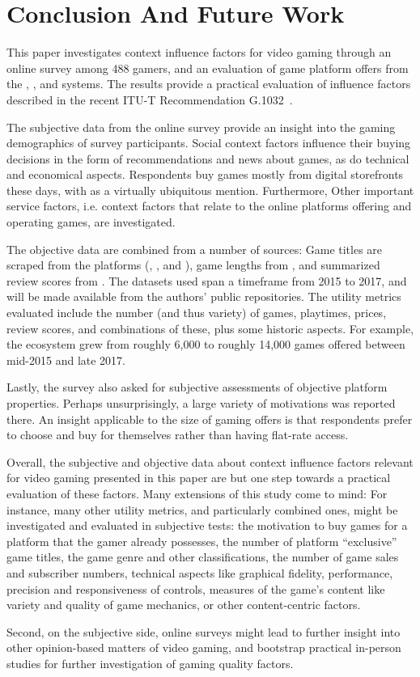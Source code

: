 \section{Conclusion And Future Work}
\label{sec:conclusion}

This paper investigates context influence factors for video gaming
through an online survey among 488 gamers, and an evaluation of
game platform offers from the \steam, \psnow, and \gfnow systems.
The results provide a practical evaluation of influence factors
described in the recent \acrshort{ITU-T} Recommendation
G.1032~\cite{itutg1032}.

The subjective data from the online survey provide an insight into
the gaming demographics of survey participants.
Social context factors influence their buying decisions in the
form of recommendations and news about games, as do technical and
economical aspects.
Respondents buy games mostly from digital storefronts these days,
with \steam as a virtually ubiquitous mention.
Furthermore, Other important service factors, i.e. context factors
that relate to the online platforms offering and operating games,
are investigated.

The objective data are combined from a number of sources:
Game titles are scraped from the platforms (\gfnow, \psnow, and \steam),
game lengths from \hltb, and summarized review scores from
\metacritic.
The datasets used span a timeframe from 2015 to 2017, and will
be made
available from the authors' public repositories.
The utility metrics evaluated include the number (and thus variety)
of games, playtimes, prices, review scores, and combinations of these,
plus some historic aspects.
For example, the \steam ecosystem grew from roughly 6,000 to roughly
14,000 games offered between mid-2015 and late 2017.

Lastly, the survey also asked for subjective assessments of objective
platform properties. Perhaps unsurprisingly, a large variety of
motivations was reported there. An insight applicable to the size
of gaming offers is that respondents prefer to choose and buy for
themselves rather than having flat-rate access.

Overall, the subjective and objective data about context influence
factors relevant for video gaming presented in this paper are but
one step towards a practical evaluation of these factors.
Many extensions of this study come to mind:
For instance, many other utility metrics, and
particularly combined ones, might be investigated and evaluated
in subjective tests:
the motivation to buy games for a platform that the gamer already
possesses,
the number of platform ``exclusive'' game titles,
the game genre and other classifications,
the number of game sales and subscriber numbers,
technical aspects like graphical fidelity, performance, precision
and responsiveness of controls,
measures of the game's content like variety and quality of game mechanics,
or other content-centric factors.

Second, on the subjective side, online surveys might lead to further
insight into other opinion-based matters of video gaming, and bootstrap
practical in-person studies for further investigation of gaming quality
factors.

